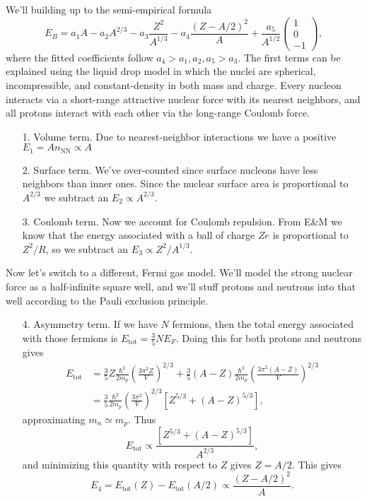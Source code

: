 \documentclass[../p052main.tex]{subfiles}
\begin{document}
We'll building up to the semi-empirical formula
\[ E_B = a_1 A - a_2 A^{2 / 3} - a_3 \frac{Z^2}{A^{1 / 3}} - a_4 \frac{(Z - A / 2)^2}{A} + \frac{a_5}{A^{1 / 2}} \begin{pmatrix} 1 \\ 0 \\ -1 \end{pmatrix}, \]
where the fitted coefficients follow $a_4 > a_1, a_2, a_5 > a_3$.
The first terms can be explained using the liquid drop model in which the nuclei are spherical, incompressible, and constant-density in both mass and charge.
Every nucleon interacts via a short-range attractive nuclear force with its nearest neighbors, and all protons interact with each other via the long-range Coulomb force.
\begin{itemize}
    \item[1.] Volume term.
    Due to nearest-neighbor interactions we have a positive $E_1 = A n_\textrm{NN} \propto A$

    \item[2.] Surface term.
    We've over-counted since surface nucleons have less neighbors than inner ones.
    Since the nuclear surface area is proportional to $A^{2 / 3}$ we subtract an $E_2 \propto A^{2 / 3}$.

    \item[3.] Coulomb term.
    Now we account for Coulomb repulsion.
    From E\&M we know that the energy associated with a ball of charge $Ze$ is proportional to $Z^2 / R$, so we subtract an $E_3 \propto Z^2 / A^{1 / 3}$.
\end{itemize}
Now let's switch to a different, Fermi gas model.
We'll model the strong nuclear force as a half-infinite square well, and we'll stuff protons and neutrons into that well according to the Pauli exclusion principle.
\begin{itemize}
    \item[4.] Asymmetry term.
    If we have $N$ fermions, then the total energy associated with those fermions is $E_\textrm{tot} = \frac{3}{5} N E_F$.
    Doing this for both protons and neutrons gives
    \begin{align*}
        E_\text{tot} &= \frac{3}{5} Z \frac{\hbar^2}{2m_p} \left( \frac{3\pi^2 Z}{V} \right)^{2 / 3} + \frac{3}{5} (A - Z) \frac{\hbar^2}{2m_p} \left( \frac{3\pi^2 (A - Z)}{V} \right)^{2 / 3} \\
        &= \frac{3}{5} \frac{\hbar^2}{2m_p} \left( \frac{3\pi^2}{V} \right)^{2 / 3} \left[ Z^{5 / 3} + (A - Z)^{5 / 3} \right],
    \end{align*}
    approximating $m_n \simeq m_p$.
    Thus
    \[ E_\text{tot} \propto \frac{\left[ Z^{5 / 3} + (A - Z)^{5 / 3} \right]}{A^{2 / 3}}, \]
    and minimizing this quantity with respect to $Z$ gives $Z = A / 2$.
    This gives
    \[ E_4 = E_\text{tot}(Z) - E_\text{tot}(A / 2) \propto \frac{(Z - A / 2)^2}{A}. \]
\end{itemize}
\end{document}
